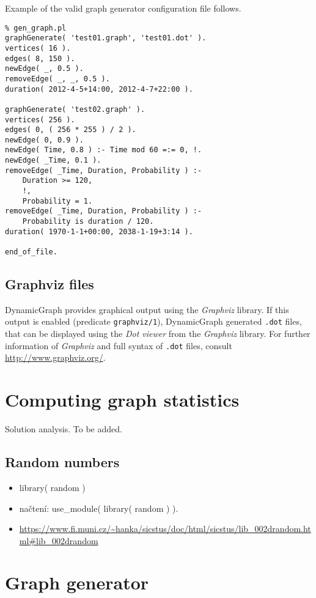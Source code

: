 \documentclass[11pt, a4paper,draft]{article}
\newcommand{\pl}[1]{\texttt{#1}} %
\theoremstyle{plain}
\theoremstyle{definition}
\theoremstyle{remark}
\newcommand{\gv}{\textit{Graphviz}}
\begin{document}
Example of the valid graph generator configuration file follows.

\begin{verbatim}
% gen_graph.pl
graphGenerate( 'test01.graph', 'test01.dot' ).
vertices( 16 ).
edges( 8, 150 ).
newEdge( _, 0.5 ).
removeEdge( _, _, 0.5 ).
duration( 2012-4-5+14:00, 2012-4-7+22:00 ).

graphGenerate( 'test02.graph' ).
vertices( 256 ).
edges( 0, ( 256 * 255 ) / 2 ).
newEdge( 0, 0.9 ).
newEdge( Time, 0.8 ) :- Time mod 60 =:= 0, !.
newEdge( _Time, 0.1 ).
removeEdge( _Time, Duration, Probability ) :-
    Duration >= 120,
    !,
    Probability = 1.
removeEdge( _Time, Duration, Probability ) :-
    Probability is duration / 120.
duration( 1970-1-1+00:00, 2038-1-19+3:14 ).

end_of_file.
\end{verbatim}

\subsection{Graphviz files}
\label{sec:files-graphviz}

DynamicGraph provides graphical output using the \gv{} library. 
If this output is enabled (predicate \pl{graphviz/1}), DynamicGraph generated \pl{.dot} files, 
that can be displayed using the \textit{Dot viewer} from the \gv{} library. 
For further information of \gv{} and full syntax of \pl{.dot} files, consult \url{http://www.graphviz.org/}.

\section{Computing graph statistics}
\label{sec:computing}

Solution analysis. To be added.

\subsection{Random numbers}
\label{sec:computing-random}
\begin{itemize}
    \item library( random )
    \item načtení: use\_module( library( random ) ).
    \item \url{https://www.fi.muni.cz/~hanka/sicstus/doc/html/sicstus/lib_002drandom.html#lib_002drandom}
\end{itemize}

\section{Graph generator}
\label{sec:generator}
\end{document}
